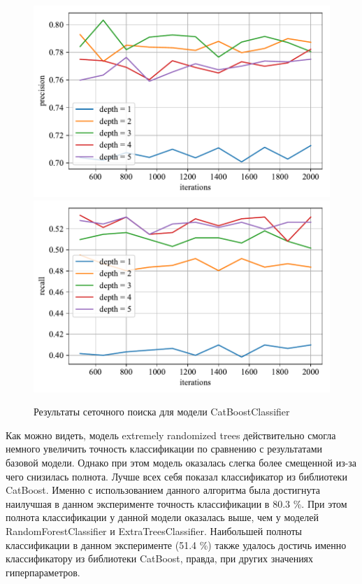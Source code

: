 \begin{figure}
    \centering
    \includegraphics{../images/toloka_catboost_precision.pdf}
    \includegraphics{../images/toloka_catboost_recall.pdf}
    \caption{Результаты сеточного поиска для модели CatBoostClassifier}
    \label{fig:toloka_catboost}
\end{figure}

Как можно видеть, модель extremely randomized trees действительно смогла немного увеличить точность классификации по сравнению с результатами базовой модели. Однако при этом модель оказалась слегка более смещенной из-за чего снизилась полнота. Лучше всех себя показал классификатор из библиотеки CatBoost. Именно с использованием данного алгоритма была достигнута наилучшая в данном эксперименте точность классификации в 80.3 \%. При этом полнота классификации у данной модели оказалась выше, чем у моделей RandomForestClassifier и ExtraTreesClassifier. Наибольшей полноты классификации в данном эксперименте (51.4 \%) также удалось достичь именно классификатору из библиотеки CatBoost, правда, при других значениях гиперпараметров.

